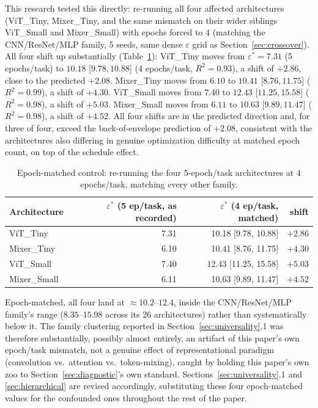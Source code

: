 \documentclass[11pt]{article}
\newcommand{\eps}{\varepsilon}
\newcommand{\epsstar}{\eps^{*}}
\begin{document}
This research tested this directly: re-running all four affected architectures
(ViT\_Tiny, Mixer\_Tiny, and the same mismatch on their wider siblings
ViT\_Small and Mixer\_Small) with epochs forced to 4 (matching the
CNN/ResNet/MLP family, 5 seeds, same dense $\eps$ grid as
Section~\ref{sec:crossover}). All four shift up substantially
(Table~\ref{tab:epochmatched}): ViT\_Tiny
moves from $\epsstar=7.31$ (5 epochs/task) to $10.18$ [$9.78,10.88$]
(4 epochs/task, $R^2=0.93$), a shift of $+2.86$, close to the predicted
$+2.08$. Mixer\_Tiny moves from $6.10$ to $10.41$ [$8.76,11.75$]
($R^2=0.99$), a shift of $+4.30$. ViT\_Small moves from $7.40$ to $12.43$
[$11.25,15.58$] ($R^2=0.98$), a shift of $+5.03$. Mixer\_Small moves from
$6.11$ to $10.63$ [$9.89,11.47$] ($R^2=0.98$), a shift of $+4.52$. All four
shifts are in the predicted direction and, for three of four, exceed the
back-of-envelope prediction of $+2.08$, consistent with the architectures
also differing in genuine optimization difficulty at matched epoch count,
on top of the schedule effect.

\begin{table}[h]
\centering
\caption{Epoch-matched control: re-running the four 5-epoch/task
architectures at 4 epochs/task, matching every other family.}
\label{tab:epochmatched}
\small
\begin{tabular}{lrrr}
\toprule
Architecture & $\epsstar$ (5 ep/task, as recorded) & $\epsstar$ (4 ep/task, matched) & shift \\
\midrule
ViT\_Tiny    & 7.31 & 10.18 [9.78, 10.88]  & $+2.86$ \\
Mixer\_Tiny  & 6.10 & 10.41 [8.76, 11.75]  & $+4.30$ \\
ViT\_Small   & 7.40 & 12.43 [11.25, 15.58] & $+5.03$ \\
Mixer\_Small & 6.11 & 10.63 [9.89, 11.47]  & $+4.52$ \\
\bottomrule
\end{tabular}
\end{table}

Epoch-matched, all four land at $\approx10.2$--$12.4$, inside
the CNN/ResNet/MLP family's range ($8.35$--$15.98$ across its 26
architectures) rather than systematically below it. The family clustering
reported in Section~\ref{sec:universality}.1 was therefore substantially,
possibly almost entirely, an artifact of this paper's own epoch/task mismatch, not
a genuine effect of representational paradigm (convolution vs.\ attention
vs.\ token-mixing), caught by holding this paper's own zoo to
Section~\ref{sec:diagnostic}'s own standard. Sections~\ref{sec:universality}.1 and
\ref{sec:hierarchical} are revised accordingly, substituting these four
epoch-matched values for the confounded ones throughout the rest of the
paper.
\end{document}
